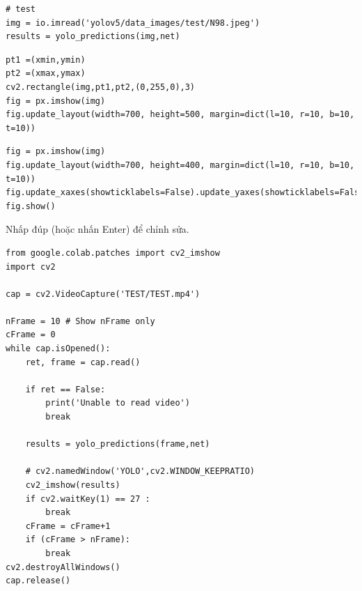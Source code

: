\documentclass{article}
\begin{document}
\begin{verbatim}
# test
img = io.imread('yolov5/data_images/test/N98.jpeg')
results = yolo_predictions(img,net)
\end{verbatim}

\begin{verbatim}
pt1 =(xmin,ymin)
pt2 =(xmax,ymax)
cv2.rectangle(img,pt1,pt2,(0,255,0),3)
fig = px.imshow(img)
fig.update_layout(width=700, height=500, margin=dict(l=10, r=10, b=10, t=10))
\end{verbatim}

\begin{verbatim}
fig = px.imshow(img)
fig.update_layout(width=700, height=400, margin=dict(l=10, r=10, b=10, t=10))
fig.update_xaxes(showticklabels=False).update_yaxes(showticklabels=False)
fig.show()
\end{verbatim}

Nhấp đúp (hoặc nhấn Enter) để chỉnh sửa.
\begin{verbatim}
from google.colab.patches import cv2_imshow
import cv2

cap = cv2.VideoCapture('TEST/TEST.mp4')

nFrame = 10 # Show nFrame only
cFrame = 0
while cap.isOpened():
    ret, frame = cap.read()

    if ret == False:
        print('Unable to read video')
        break

    results = yolo_predictions(frame,net)

    # cv2.namedWindow('YOLO',cv2.WINDOW_KEEPRATIO)
    cv2_imshow(results)
    if cv2.waitKey(1) == 27 :
        break
    cFrame = cFrame+1
    if (cFrame > nFrame):
        break
cv2.destroyAllWindows()
cap.release()
\end{verbatim}

\end{document}
